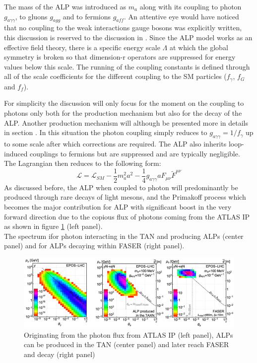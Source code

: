 		The mass of the ALP was introduced as $m_a$ along with its coupling to photon $g_{a\gamma\gamma}$, to gluons $g_{agg}$ and to fermions $g_{aff}$. An attentive eye would have noticed that no coupling to the weak interactions gauge bosons was explicitly written, this discussion is reserved to the discussion in . Since the ALP model works as an effective field theory, there is a specific energy scale $\Lambda$ at which the global symmetry is broken so that dimension-r operators are suppressed for energy values below this scale. The running of the coupling constants is defined through all of the scale coefficients for the different coupling to the SM particles ($f_\gamma$, $f_G$ and $f_f$). 
		
		For simplicity the discussion will only focus for the moment on the coupling to photons only both for the production mechanism but also for the decay of the ALP. Another production mechanism will although be presented more in details in section . In this situation the photon coupling simply reduces to $g_{a \gamma\gamma} = 1/f_\gamma$ up to some scale after which corrections are required. The ALP also inherits loop-induced couplings to fermions but are suppressed and are typically negligible. The Lagrangian then reduces to the following form: 
		\begin{equation}
			\mathcal{L} = \mathcal{L}_{SM} - \frac{1}{2} m_a^2 a^2 - \frac{1}{4} g_{a\gamma\gamma} a F_{\mu\nu} \tilde{F}^{\mu\nu}
		\end{equation}
		As discussed before, the ALP when coupled to photon will predominantly be produced through rare decays of light mesons, and the Primakoff process \cite{ALPTraum} which becomes the major contribution for ALP with significant boost in the very forward direction due to the copious flux of photons coming from the ATLAS IP as shown in figure \ref{im:photon_ATLAS_ALP} (left panel). \\ The spectrum ifor photon interacting in the TAN and producing ALPs (center panel) and for ALPs decaying within FASER (right panel). 
		\begin{figure}[h]
			\centering
			\includegraphics[width=0.95\linewidth]{files/primakoff_prod_TAN}
			\caption{Originating from the photon flux from ATLAS IP (left panel), ALPs can be produced in the TAN (center panel) and later reach FASER and decay (right panel)}
			\label{im:photon_ATLAS_ALP}
		\end{figure}
		
